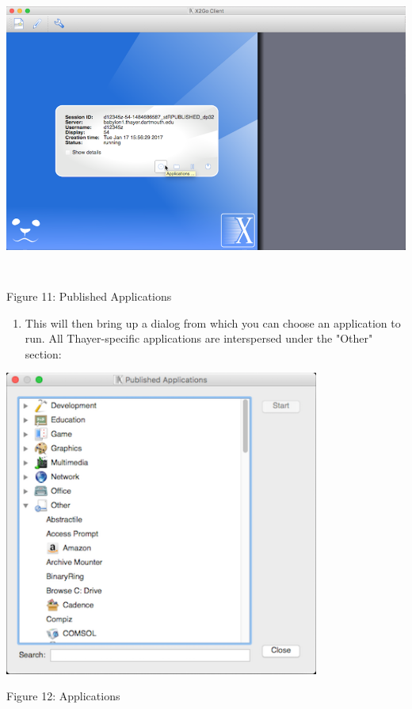 \documentclass[
]{article}
\begin{document}
\includegraphics[width=6.26806in,height=3.83718in]{images/media/image11.png}

Figure 11: Published Applications

\begin{enumerate}
\def\labelenumi{\arabic{enumi}.}
\setcounter{enumi}{17}
\item
  This will then bring up a dialog from which you can choose an
  application to run. All Thayer-specific applications are interspersed
  under the "Other" section:
\end{enumerate}

\includegraphics[width=4.07153in,height=3.96413in]{images/media/image12.png}

Figure 12: Applications
\end{document}

